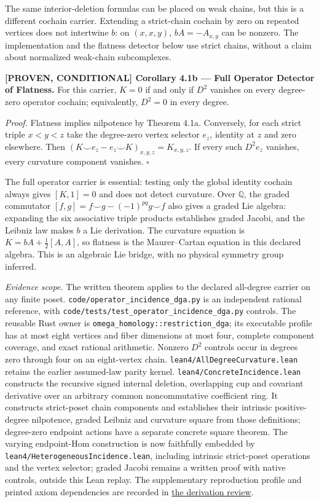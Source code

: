 \documentclass[
  english,
  10pt,
  a4paper,
]{article}
\renewenvironment{quote}
  {\begin{leftbar}\small}
  {\end{leftbar}}
\begin{document}
The same interior-deletion formulas can be placed on weak chains, but
this is a different cochain carrier. Extending a strict-chain cochain by
zero on repeated vertices does not intertwine \(b\): on \((x,x,y)\),
\(bA=-A_{x,y}\) can be nonzero. The implementation and the flatness
detector below use strict chains, without a claim about normalized
weak-chain subcomplexes.

\begin{quote}
\textbf{{[}PROVEN, CONDITIONAL{]} Corollary 4.1b --- Full Operator
Detector of Flatness.} For this carrier, \(K=0\) if and only if \(D^2\)
vanishes on every degree-zero operator cochain; equivalently, \(D^2=0\)
in every degree.

\emph{Proof.} Flatness implies nilpotence by Theorem 4.1a. Conversely,
for each strict triple \(x<y<z\) take the degree-zero vertex selector
\(e_z\), identity at \(z\) and zero elsewhere. Then
\((K\smile e_z-e_z\smile K)_{x,y,z}=K_{x,y,z}\). If every such
\(D^2e_z\) vanishes, every curvature component vanishes. \(\square\)
\end{quote}

The full operator carrier is essential: testing only the global identity
cochain always gives \([K,1]=0\) and does not detect curvature. Over
\(\mathbb Q\), the graded commutator
\([f,g]=f\smile g-(-1)^{pq}g\smile f\) also gives a graded Lie algebra:
expanding the six associative triple products establishes graded Jacobi,
and the Leibniz law makes \(b\) a Lie derivation. The curvature equation
is \(K=bA+\tfrac12[A,A]\), so flatness is the Maurer--Cartan equation in
this declared algebra. This is an algebraic Lie bridge, with no physical
symmetry group inferred.

\emph{Evidence scope.} The written theorem applies to the declared
all-degree carrier on any finite poset.
\nolinkurl{code/operator_incidence_dga.py} is an independent rational
reference, with \nolinkurl{code/tests/test_operator_incidence_dga.py}
controls. The reusable Rust owner is
\nolinkurl{omega_homology::restriction_dga}; its executable profile has
at most eight vertices and fiber dimensions at most four, complete
component coverage, and exact rational arithmetic. Nonzero \(D^2\)
controls occur in degrees zero through four on an eight-vertex chain.
\nolinkurl{lean4/AllDegreeCurvature.lean} retains the earlier
assumed-law parity kernel. \nolinkurl{lean4/ConcreteIncidence.lean}
constructs the recursive signed internal deletion, overlapping cup and
covariant derivative over an arbitrary common noncommutative coefficient
ring. It constructs strict-poset chain components and establishes their
intrinsic positive-degree nilpotence, graded Leibniz and curvature
square from those definitions; degree-zero endpoint actions have a
separate concrete square theorem. The varying endpoint-Hom construction
is now faithfully embedded by
\nolinkurl{lean4/HeterogeneousIncidence.lean}, including intrinsic
strict-poset operations and the vertex selector; graded Jacobi remains a
written proof with native controls, outside this Lean replay. The
supplementary reproduction profile and printed axiom dependencies are
recorded in \href{docs/derivations_2026_10_14.md}{the derivation
review}.
\end{document}
